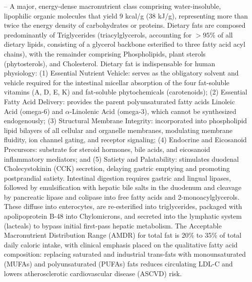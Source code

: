 -- A major, energy-dense macronutrient class comprising water-insoluble, lipophilic organic molecules that yield 9 kcal/g (38 kJ/g), representing more than twice the energy density of carbohydrates or proteins. Dietary fats are composed predominantly of Triglycerides (triacylglycerols, accounting for $>95\%$ of all dietary lipids, consisting of a glycerol backbone esterified to three fatty acid acyl chains), with the remainder comprising Phospholipids, plant sterols (phytosterols), and Cholesterol. Dietary fat is indispensable for human physiology: (1) Essential Nutrient Vehicle: serves as the obligatory solvent and vehicle required for the intestinal micellar absorption of the four fat-soluble vitamins (A, D, E, K) and fat-soluble phytochemicals (carotenoids); (2) Essential Fatty Acid Delivery: provides the parent polyunsaturated fatty acids Linoleic Acid (omega-6) and $\alpha$-Linolenic Acid (omega-3), which cannot be synthesized endogenously; (3) Structural Membrane Integrity: incorporated into phospholipid lipid bilayers of all cellular and organelle membranes, modulating membrane fluidity, ion channel gating, and receptor signaling; (4) Endocrine and Eicosanoid Precursors: substrate for steroid hormones, bile acids, and eicosanoid inflammatory mediators; and (5) Satiety and Palatability: stimulates duodenal Cholecystokinin (CCK) secretion, delaying gastric emptying and promoting postprandial satiety. Intestinal digestion requires gastric and lingual lipases, followed by emulsification with hepatic bile salts in the duodenum and cleavage by pancreatic lipase and colipase into free fatty acids and 2-monoacylglycerols. These diffuse into enterocytes, are re-esterified into triglycerides, packaged with apolipoprotein B-48 into Chylomicrons, and secreted into the lymphatic system (lacteals) to bypass initial first-pass hepatic metabolism. The Acceptable Macronutrient Distribution Range (AMDR) for total fat is 20\% to 35\% of total daily caloric intake, with clinical emphasis placed on the qualitative fatty acid composition: replacing saturated and industrial trans-fats with monounsaturated (MUFAs) and polyunsaturated (PUFAs) fats reduces circulating LDL-C and lowers atherosclerotic cardiovascular disease (ASCVD) risk.

